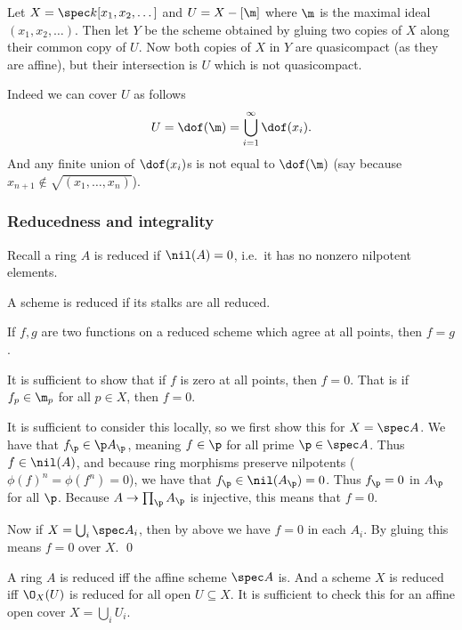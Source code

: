 \eexam

\bexam

    Let $X=\spec k[x_1,x_2,\dots]$ and $U=X-[\m]$ where $\m$ is the maximal ideal $(x_1,x_2,\dots)$.
    Then let $Y$ be the scheme obtained by gluing two copies of $X$ along their common copy of $U$.
    Now both copies of $X$ in $Y$ are quasicompact (as they are affine), but their intersection is $U$ which is not quasicompact.

    Indeed we can cover $U$ as follows
    $$ U = \dof(\m) = \bigcup_{i=1}^\infty \dof(x_i) . $$
    And any finite union of $\dof(x_i)$s is not equal to $\dof(\m)$ (say because $x_{n+1}\notin\sqrt{(x_1,\dots,x_n)}$).

\eexam

\subsubsection{Reducedness and integrality}

Recall a ring $A$ is {\emphcolor reduced} if $\nil(A)=0$, i.e.\ it has no nonzero nilpotent elements.

\bdefn

    A scheme is {\emphcolor reduced} if its stalks are all reduced.

\edefn

\bprop[name={samefuncredscheme}]

    If $f,g$ are two functions on a reduced scheme which agree at all points, then $f=g$.

\eprop

\bproof

    It is sufficient to show that if $f$ is zero at all points, then $f=0$.
    That is if $f_p\in\m_p$ for all $p\in X$, then $f=0$.

    It is sufficient to consider this locally, so we first show this for $X=\spec A$.
    We have that $f_\p\in\p A_\p$, meaning $f\in\p$ for all prime $\p\in\spec A$.
    Thus $f\in\nil(A)$, and because ring morphisms preserve nilpotents ($\phi(f)^n=\phi(f^n)=0$), we have that $f_\p\in\nil(A_\p)=0$.
    Thus $f_\p=0$ in $A_\p$ for all $\p$.
    Because $A\to\prod_\p A_\p$ is injective, this means that $f=0$.

    Now if $X=\bigcup_i\spec A_i$, then by above we have $f=0$ in each $A_i$.
    By gluing this means $f=0$ over $X$.
    \qed

\eproof

\bprop[name={redschemecond}]

    A ring $A$ is reduced iff the affine scheme $\spec A$ is.
    And a scheme $X$ is reduced iff $\O_X(U)$ is reduced for all open $U\subseteq X$.
    It is sufficient to check this for an affine open cover $X=\bigcup_iU_i$.

